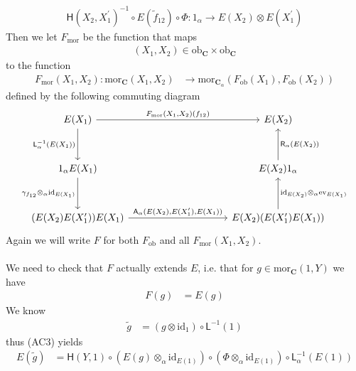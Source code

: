 \begin{prf}
\begin{align*}
  \mathsf{H}(X_{2},X_{1}^{\prime})^{-1}
  \circ
  E(\tilde{f}_{12})
  \circ
  \Phi
  \colon
  1_{\alpha}
  \to
  E(X_{2})
  \otimes
  E(X_{1}^{\prime})
\end{align*}
Then we let $F_{\mathrm{mor}}$ be the function that maps
\begin{align*}
  (X_{1},X_{2})
  \in
  \mathrm{ob}_{\mathbf{C}}
  \times
  \mathrm{ob}_{\mathbf{C}}
\end{align*}
to the function
\begin{align*}
  F_{\mathrm{mor}}(X_{1},X_{2})
  \colon
  \mathrm{mor}_{\mathbf{C}}(X_{1},X_{2})
  &\to
  \mathrm{mor}_{\mathbf{C}_{\alpha}}(F_{\mathrm{ob}}(X_{1}),F_{\mathrm{ob}}(X_{2}))
\end{align*}
defined by the following commuting diagram
\begin{equation*}
\begin{tikzcd}[row sep=3.2em,column sep=10em]
  E(X_{1})
  \ar{r}{F_{\mathrm{mor}}(X_{1},X_{2})(f_{12})}
  \ar{d}[swap]{\mathsf{L}_{\alpha}^{-1}(E(X_{1}))}
  &
  E(X_{2})
  \\
  1_{\alpha} E(X_{1})
  \ar{d}[swap]{\gamma_{f_{12}} \otimes_{\alpha} \mathrm{id}_{E(X_{1})}}
  &
  E(X_{2}) 1_{\alpha}
  \ar{u}[swap]{\mathsf{R}_{\alpha}(E(X_{2}))}
  \\
  (E(X_{2}) E(X_{1}^{\prime})) E(X_{1})
  \ar{r}{\mathsf{A}_{\alpha}(E(X_{2}),E(X_{1}^{\prime}),E(X_{1}))}
  &
  E(X_{2}) (E(X_{1}^{\prime}) E(X_{1}))
  \ar{u}[swap]{\mathrm{id}_{E(X_{2})} \otimes_{\alpha} \mathrm{ev}_{E(X_{1})}}
\end{tikzcd}
\end{equation*}
Again we will write $F$ for both $F_{\mathrm{ob}}$ and all $F_{\mathrm{mor}}(X_{1},X_{2})$.
\\\\
We need to check that $F$ actually extends $E$, i.e. that for $g \in \mathrm{mor}_{\mathbf{C}}(1,Y)$ we have
\begin{align*}
  F(g)
  &=
  E(g)
\end{align*}
We know
\begin{align*}
  \tilde{g}
  &=
  (g \otimes \mathrm{id}_{1})
  \circ
  \mathsf{L}^{-1}(1)
\end{align*}
thus (AC3) yields
\begin{align*}
  E(\tilde{g})
  &=
  \mathsf{H}(Y,1)
  \circ
  \left(
    E(g)
    \otimes_{\alpha}
    \mathrm{id}_{E(1)}
  \right)
  \circ
  \left(
    \Phi
    \otimes_{\alpha}
    \mathrm{id}_{E(1)}
  \right)
  \circ
  \mathsf{L}_{\alpha}^{-1}(E(1))
  \\

\end{align*}
\end{prf}
